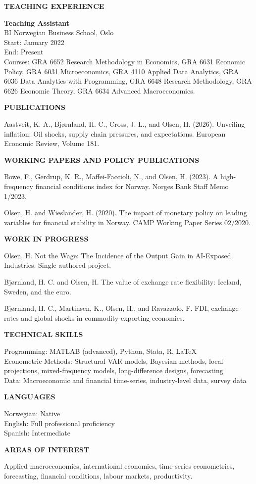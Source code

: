 \documentclass[11pt,a4paper]{article}
\begin{document}
\bigskip
\textbf{TEACHING EXPERIENCE}

\textbf{Teaching Assistant}\\
BI Norwegian Business School, Oslo\\
Start: January 2022\\
End: Present\\
Courses: GRA 6652 Research Methodology in Economics, GRA 6631 Economic Policy, GRA 6031 Microeconomics, GRA 4110 Applied Data Analytics, GRA 6036 Data Analytics with Programming, GRA 6648 Research Methodology, GRA 6626 Economic Theory, GRA 6634 Advanced Macroeconomics.

\bigskip
\textbf{PUBLICATIONS}

Aastveit, K. A., Bjørnland, H. C., Cross, J. L., and Olsen, H. (2026). Unveiling inflation: Oil shocks, supply chain pressures, and expectations. European Economic Review, Volume 181.

\bigskip
\textbf{WORKING PAPERS AND POLICY PUBLICATIONS}

Bowe, F., Gerdrup, K. R., Maffei-Faccioli, N., and Olsen, H. (2023). A high-frequency financial conditions index for Norway. Norges Bank Staff Memo 1/2023.

Olsen, H. and Wieslander, H. (2020). The impact of monetary policy on leading variables for financial stability in Norway. CAMP Working Paper Series 02/2020.

\bigskip
\textbf{WORK IN PROGRESS}

Olsen, H. Not the Wage: The Incidence of the Output Gain in AI-Exposed Industries. Single-authored project.

Bjørnland, H. C. and Olsen, H. The value of exchange rate flexibility: Iceland, Sweden, and the euro.

Bjørnland, H. C., Martinsen, K., Olsen, H., and Ravazzolo, F. FDI, exchange rates and global shocks in commodity-exporting economies.

\bigskip
\textbf{TECHNICAL SKILLS}

Programming: MATLAB (advanced), Python, Stata, R, LaTeX\\
Econometric Methods: Structural VAR models, Bayesian methods, local projections, mixed-frequency models, long-difference designs, forecasting\\
Data: Macroeconomic and financial time-series, industry-level data, survey data

\bigskip
\textbf{LANGUAGES}

Norwegian: Native\\
English: Full professional proficiency\\
Spanish: Intermediate

\bigskip
\textbf{AREAS OF INTEREST}

Applied macroeconomics, international economics, time-series econometrics, forecasting, financial conditions, labour markets, productivity.
\end{document}
